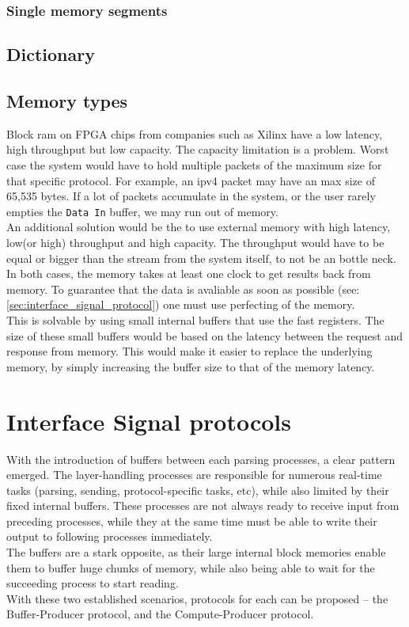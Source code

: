 \subsubsection{Single memory segments}


\subsection{Dictionary} \label{subsec:dictionary}

\subsection{Memory types}  \label{subsec:memory_types}
Block ram on FPGA chips from companies such as Xilinx have a low latency, high
throughput but low capacity.\cite{xilinx_fpga_memory_resources}
The capacity limitation is a problem. Worst case the
system would have to hold multiple packets of the maximum size for that specific
protocol. For example, an \gls{ipv4} packet may have an max size of 65,535
bytes.\cite{RFC0791} If a lot of packets accumulate in the system, or the user
rarely empties the \texttt{Data In} buffer, we may run out of memory.\\
An additional solution would be the to use external memory with high latency,
low(or high) throughput and high capacity. The throughput would have to be equal
or bigger than the stream from the system itself, to not be an bottle neck.\\
In both cases, the memory takes at least one clock to get results back from
memory. To guarantee that the data is avaliable as soon as possible
(see: \autoref{sec:interface_signal_protocol}) one must use perfecting of the
memory.\\
This is solvable by using small internal buffers that use the fast registers.
The size of these small buffers would be based on the latency between the
request and response from memory. This would make it easier to
replace the underlying memory, by simply increasing the buffer size to that
of the memory latency.


\section{Interface Signal protocols}
\label{sec:interface_signal_protocol}
With the introduction of buffers between each parsing processes, a clear pattern
emerged. The layer-handling processes are responsible for numerous real-time tasks
(parsing, sending, protocol-specific tasks, etc), while also limited by their
fixed internal buffers. These processes are not always ready to receive input
from preceding processes, while they at the same time must be able to write their
output to following processes immediately.\\
The buffers are a stark opposite, as their large internal block memories enable
them to buffer huge chunks of memory, while also being able to wait for the
succeeding process to start reading.\\
With these two established scenarios, protocols for each can be proposed -- the
Buffer-Producer protocol, and the Compute-Producer protocol.

